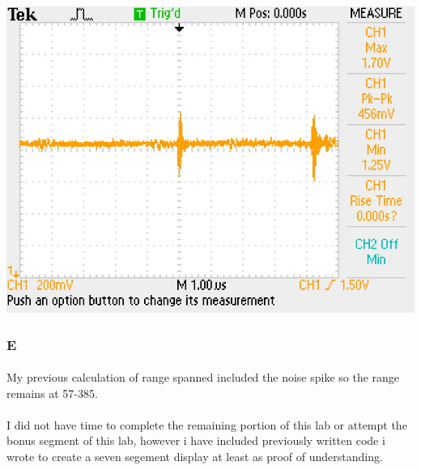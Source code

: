 \documentclass[12pt]{article}
\begin{document}
					\begin{center}
						\includegraphics[scale=0.5]{spike.jpg}\\
					\end{center}

			\subsubsection{E}
				\paragraph{}
					My previous calculation of range spanned included the noise spike so the range remains at 57-385.

			\paragraph{}
				I did not have time to complete the remaining portion of this lab or attempt the bonus segment of this lab, however i have included previously 
				written code i wrote to create a seven segement display at least as proof of understanding.
\end{document}
